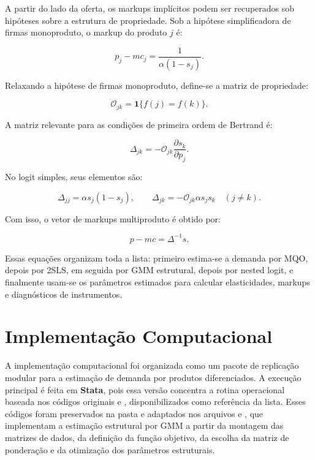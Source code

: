 \documentclass[12pt,a4paper]{article}
\begin{document}
A partir do lado da oferta, os markups implícitos podem ser recuperados sob hipóteses sobre a estrutura de propriedade. Sob a hipótese simplificadora de firmas monoproduto, o markup do produto \(j\) é:

\begin{equation}
    p_j-mc_j
    =
    \frac{1}{\alpha(1-s_j)}.
    \label{eq:markup_mono}
\end{equation}

Relaxando a hipótese de firmas monoproduto, define-se a matriz de propriedade:

\begin{equation}
    \mathcal{O}_{jk}
    =
    \mathbf{1}\{f(j)=f(k)\}.
    \label{eq:ownership}
\end{equation}

A matriz relevante para as condições de primeira ordem de Bertrand é:

\begin{equation}
    \Delta_{jk}
    =
    -\mathcal{O}_{jk}\frac{\partial s_k}{\partial p_j}.
    \label{eq:delta_markup}
\end{equation}

No logit simples, seus elementos são:

\begin{equation}
    \Delta_{jj}
    =
    \alpha s_j(1-s_j),
    \qquad
    \Delta_{jk}
    =
    -\mathcal{O}_{jk}\alpha s_js_k
    \quad (j\neq k).
    \label{eq:delta_logit}
\end{equation}

Com isso, o vetor de markups multiproduto é obtido por:

\begin{equation}
    p-mc
    =
    \Delta^{-1}s.
    \label{eq:markup_multi}
\end{equation}

Essas equações organizam toda a lista: primeiro estima-se a demanda por MQO, depois por 2SLS, em seguida por GMM estrutural, depois por nested logit, e finalmente usam-se os parâmetros estimados para calcular elasticidades, markups e diagnósticos de instrumentos.

\section{Implementação Computacional}

A implementação computacional foi organizada como um pacote de replicação modular para a estimação de demanda por produtos diferenciados. A execução principal é feita em \textbf{Stata}, pois essa versão concentra a rotina operacional baseada nos códigos originais  e , disponibilizados como referência da lista. Esses códigos foram preservados na pasta  e adaptados nos arquivos  e , que implementam a estimação estrutural por GMM a partir da montagem das matrizes de dados, da definição da função objetivo, da escolha da matriz de ponderação e da otimização dos parâmetros estruturais.
\end{document}
